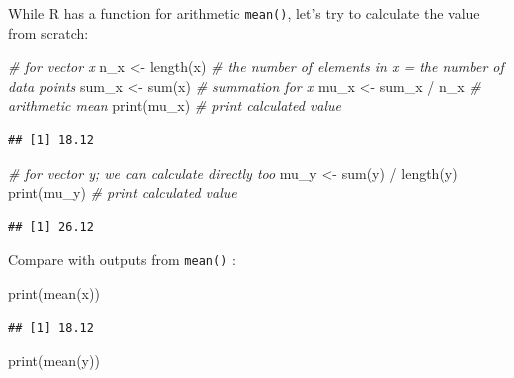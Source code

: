 \documentclass[
]{book}
\newenvironment{Shaded}{\begin{snugshade}}{\end{snugshade}}
\newcommand{\CommentTok}[1]{\textcolor[rgb]{0.56,0.35,0.01}{\textit{#1}}}
\newcommand{\FunctionTok}[1]{\textcolor[rgb]{0.00,0.00,0.00}{#1}}
\newcommand{\NormalTok}[1]{#1}
\newcommand{\OtherTok}[1]{\textcolor[rgb]{0.56,0.35,0.01}{#1}}
\newcommand{\SpecialCharTok}[1]{\textcolor[rgb]{0.00,0.00,0.00}{#1}}
\begin{document}
While R has a function for arithmetic \texttt{mean()}, let's try to calculate the value from scratch:

\begin{Shaded}
\begin{Highlighting}[]
\CommentTok{\# for vector x}
\NormalTok{n\_x }\OtherTok{\textless{}{-}} \FunctionTok{length}\NormalTok{(x) }\CommentTok{\# the number of elements in x = the number of data points}
\NormalTok{sum\_x }\OtherTok{\textless{}{-}} \FunctionTok{sum}\NormalTok{(x) }\CommentTok{\# summation for x}
\NormalTok{mu\_x }\OtherTok{\textless{}{-}}\NormalTok{ sum\_x }\SpecialCharTok{/}\NormalTok{ n\_x }\CommentTok{\# arithmetic mean}
\FunctionTok{print}\NormalTok{(mu\_x) }\CommentTok{\# print calculated value}
\end{Highlighting}
\end{Shaded}

\begin{verbatim}
## [1] 18.12
\end{verbatim}

\begin{Shaded}
\begin{Highlighting}[]
\CommentTok{\# for vector y; we can calculate directly too}
\NormalTok{mu\_y }\OtherTok{\textless{}{-}} \FunctionTok{sum}\NormalTok{(y) }\SpecialCharTok{/} \FunctionTok{length}\NormalTok{(y)}
\FunctionTok{print}\NormalTok{(mu\_y) }\CommentTok{\# print calculated value}
\end{Highlighting}
\end{Shaded}

\begin{verbatim}
## [1] 26.12
\end{verbatim}

Compare with outputs from \texttt{mean()} :

\begin{Shaded}
\begin{Highlighting}[]
\FunctionTok{print}\NormalTok{(}\FunctionTok{mean}\NormalTok{(x))}
\end{Highlighting}
\end{Shaded}

\begin{verbatim}
## [1] 18.12
\end{verbatim}

\begin{Shaded}
\begin{Highlighting}[]
\FunctionTok{print}\NormalTok{(}\FunctionTok{mean}\NormalTok{(y))}
\end{Highlighting}
\end{Shaded}
\end{document}
